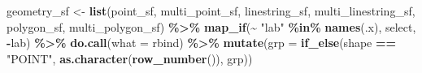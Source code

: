 \documentclass[
]{report}
\newenvironment{Shaded}{\begin{snugshade}}{\end{snugshade}}
\newcommand{\DataTypeTok}[1]{\textcolor[rgb]{0.13,0.29,0.53}{#1}}
\newcommand{\KeywordTok}[1]{\textcolor[rgb]{0.13,0.29,0.53}{\textbf{#1}}}
\newcommand{\NormalTok}[1]{#1}
\newcommand{\OperatorTok}[1]{\textcolor[rgb]{0.81,0.36,0.00}{\textbf{#1}}}
\newcommand{\StringTok}[1]{\textcolor[rgb]{0.31,0.60,0.02}{#1}}
\begin{document}
\begin{Shaded}
\begin{Highlighting}[]
\NormalTok{geometry\_sf \textless{}{-}}\StringTok{ }\KeywordTok{list}\NormalTok{(point\_sf, multi\_point\_sf, linestring\_sf, }
\NormalTok{                    multi\_linestring\_sf, polygon\_sf, multi\_polygon\_sf) }\OperatorTok{\%\textgreater{}\%}\StringTok{ }
\StringTok{  }\KeywordTok{map\_if}\NormalTok{(}\OperatorTok{\textasciitilde{}}\StringTok{ "lab"} \OperatorTok{\%in\%}\StringTok{ }\KeywordTok{names}\NormalTok{(.x), select, }\OperatorTok{{-}}\NormalTok{lab) }\OperatorTok{\%\textgreater{}\%}
\StringTok{  }\KeywordTok{do.call}\NormalTok{(}\DataTypeTok{what =}\NormalTok{ rbind) }\OperatorTok{\%\textgreater{}\%}\StringTok{ }
\StringTok{  }\KeywordTok{mutate}\NormalTok{(}\DataTypeTok{grp =} \KeywordTok{if\_else}\NormalTok{(shape }\OperatorTok{==}\StringTok{ "POINT"}\NormalTok{, }\KeywordTok{as.character}\NormalTok{(}\KeywordTok{row\_number}\NormalTok{()), grp))}


\end{Highlighting}
\end{Shaded}
\end{document}
